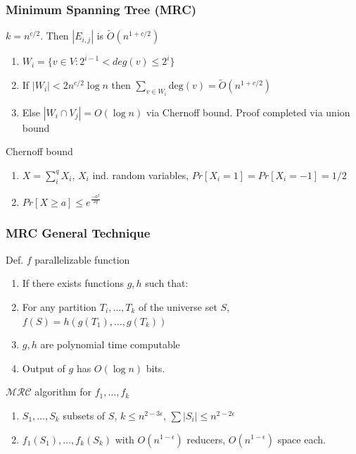 \documentclass[12pt,aspectratio=169]{beamer}
\begin{document}
\begin{frame}\frametitle{Minimum Spanning Tree (MRC)}
  \begin{block}{$k = n^{c/2}$.    Then $|E_{i,j}|$ is $\tilde{O}(n^{1+c/2})$}
    \begin{enumerate}
      \item
        $W_{i} = \{v \in V : 2^{i-1} < deg(v) \le 2^{i} \}$
      \item
        If $|W_{i} | < 2n^{c/2}\log n $ then $\sum_{v\in W_{i}}\text{deg}(v) =
        \tilde{O}(n^{1+c/2})$
      \item
        Else $|W_{i} \cap V_{j}| = O(\log n)$ via Chernoff bound.
        Proof completed via union bound
      \end{enumerate}
    \end{block}

    \begin{block}{Chernoff bound}
    \begin{enumerate}
      \item
      $X=\sum_{i}^{q}X_{i}$, $X_{i}$ ind. random variables, $Pr[X_{i}=1]=Pr[X_{i}=-1]=1/2$
    \item
      $Pr[X\ge a] \le e^{\frac{-a^{2}}{2q}}$
    \end{enumerate}
  \end{block}
\end{frame}


\begin{frame}\frametitle{MRC General Technique}
  \begin{block}{Def. $f$ parallelizable function}
    \begin{enumerate}
    \item
      If there exists functions $g, h$ such that:
    \item
      For any partition $T_{i}, \ldots , T_{k}$ of the universe set $S$, $f(S)
      = h(g(T_{1}), \ldots , g(T_{k}))$
    \item
      $g, h$ are polynomial time computable
    \item
      Output of $g$ has $O(\log n)$ bits.
    \end{enumerate}
  \end{block}

  \begin{block}{$\mathcal{MRC}$ algorithm for $f_{1}, \ldots, f_{k}$}
    \begin{enumerate}
    \item
      $S_{1}, \ldots , S_{k}$ subsets of $S$, $k\le n^{2-3\epsilon}$, $\sum
      |S_{i}|\le n^{2-2\epsilon}$
    \item
      $f_{1}(S_{1}), \ldots , f_{k}(S_{k})$ with $O(n^{1-\epsilon})$ reducers,
      $O(n^{1-\epsilon})$ space each.
    \end{enumerate}
  \end{block}
\end{frame}
\end{document}
